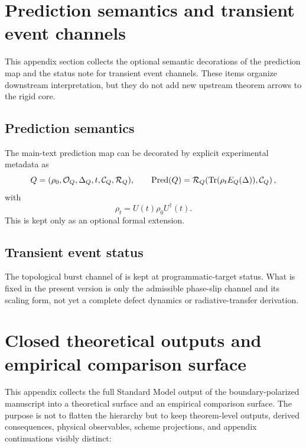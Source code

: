 \section{Prediction semantics and transient event channels}
\label{app:prediction-semantics}

This appendix section collects the optional semantic decorations of the prediction map and the
status note for transient event channels. These items organize downstream interpretation, but they
do not add new upstream theorem arrows to the rigid core.

\subsection{Prediction semantics}

The main-text prediction map can be decorated by explicit experimental metadata as
\[
Q=(\rho_0,\mathcal O_Q,\Delta_Q,t,\mathcal C_Q,\mathcal R_Q),
\qquad
\operatorname{Pred}(Q)=\mathcal R_Q\!\left(\operatorname{Tr}(\rho_tE_Q(\Delta)),\mathcal C_Q\right),
\]
with
\[
\rho_t=U(t)\rho_0U^\dagger(t).
\]
This is kept only as an optional formal extension.

\subsection{Transient event status}

The topological burst channel of  is kept at
programmatic-target status. What is fixed in the present version is only the admissible phase-slip
channel and its scaling form, not yet a complete defect dynamics or radiative-transfer derivation.

\section{Closed theoretical outputs and empirical comparison surface}
\label{app:global-particle-ledger}

This appendix collects the full Standard Model output of the boundary-polarized manuscript into a
theoretical surface and an empirical comparison surface. The purpose is not to flatten the
hierarchy but to keep theorem-level outputs, derived consequences, physical observables, scheme projections, and appendix continuations
visibly distinct:

